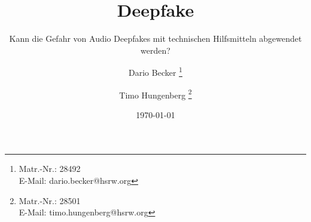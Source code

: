 \titlehead{
{\Large Hochschule Rhein Waal}\\
Fakultät für Kommunikation und Umwelt\\
Friedrich-Heinrich-Allee 25\\
47475 Kamp-Lintfort
}

\subject{
Abschlussbericht\\
\normalfont
im Modul Wissenschaftliches Arbeiten\\
}

\title{Deepfake}

\subtitle{Kann die Gefahr von Audio Deepfakes mit technischen Hilfsmitteln abgewendet werden?}
\author{
Dario Becker
\thanks{
 Matr.-Nr.: 28492\\
E-Mail: dario.becker@hsrw.org}
\and Timo Hungenberg
\thanks{
Matr.-Nr.: 28501\\
E-Mail: timo.hungenberg@hsrw.org}
}

\date{\today}


\maketitle
